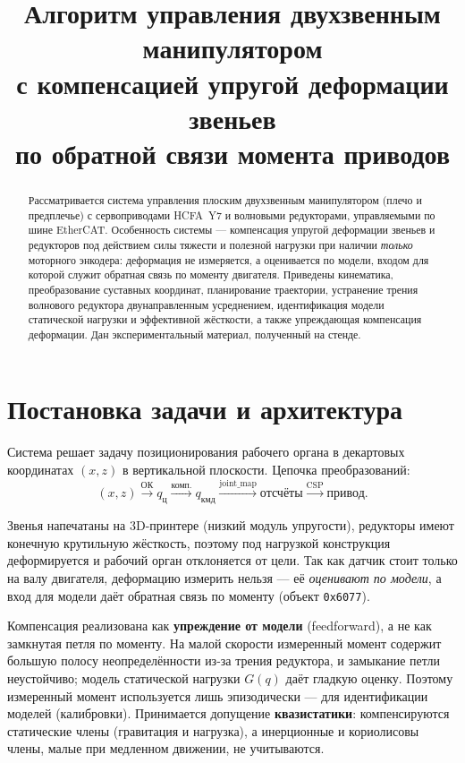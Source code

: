 \documentclass[12pt,a4paper]{article}
\title{Алгоритм управления двухзвенным манипулятором\\
с компенсацией упругой деформации звеньев\\
по обратной связи момента приводов}
\author{}
\date{}
\begin{document}
\maketitle

\begin{abstract}
Рассматривается система управления плоским двухзвенным манипулятором (плечо и
предплечье) с сервоприводами HCFA~Y7 и волновыми редукторами, управляемыми по
шине EtherCAT. Особенность системы — компенсация упругой деформации звеньев и
редукторов под действием силы тяжести и полезной нагрузки при наличии
\emph{только} моторного энкодера: деформация не измеряется, а оценивается по
модели, входом для которой служит обратная связь по моменту двигателя. Приведены
кинематика, преобразование суставных координат, планирование траектории,
устранение трения волнового редуктора двунаправленным усреднением, идентификация
модели статической нагрузки и эффективной жёсткости, а также упреждающая
компенсация деформации. Дан экспериментальный материал, полученный на стенде.
\end{abstract}

\tableofcontents

\section{Постановка задачи и архитектура}

Система решает задачу позиционирования рабочего органа в декартовых координатах
$(x,z)$ в вертикальной плоскости. Цепочка преобразований:
\[
(x,z)\xrightarrow{\text{ОК}} q_\text{ц}
\xrightarrow{\text{комп.}} q_\text{кмд}
\xrightarrow{\text{joint\_map}} \text{отсчёты}
\xrightarrow{\text{CSP}} \text{привод}.
\]

Звенья напечатаны на 3D-принтере (низкий модуль упругости), редукторы имеют
конечную крутильную жёсткость, поэтому под нагрузкой конструкция деформируется и
рабочий орган отклоняется от цели. Так как датчик стоит только на валу
двигателя, деформацию измерить нельзя — её \emph{оценивают по модели}, а вход
для модели даёт обратная связь по моменту (объект \texttt{0x6077}).

Компенсация реализована как \textbf{упреждение от модели} (feedforward), а не
как замкнутая петля по моменту. На малой скорости измеренный момент содержит
большую полосу неопределённости из-за трения редуктора, и замыкание петли
неустойчиво; модель статической нагрузки $G(q)$ даёт гладкую оценку. Поэтому
измеренный момент используется лишь эпизодически — для идентификации моделей
(калибровки). Принимается допущение \textbf{квазистатики}: компенсируются
статические члены (гравитация и нагрузка), а инерционные и кориолисовы
члены, малые при медленном движении, не учитываются.
\end{document}
